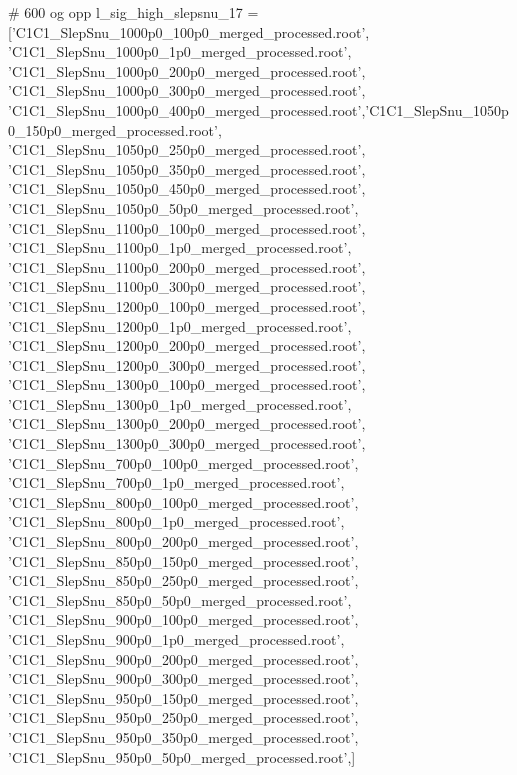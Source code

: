 # 600 og opp
l_sig_high_slepsnu_17 = ['C1C1_SlepSnu_1000p0_100p0_merged_processed.root',
'C1C1_SlepSnu_1000p0_1p0_merged_processed.root',
'C1C1_SlepSnu_1000p0_200p0_merged_processed.root',
'C1C1_SlepSnu_1000p0_300p0_merged_processed.root',
'C1C1_SlepSnu_1000p0_400p0_merged_processed.root','C1C1_SlepSnu_1050p0_150p0_merged_processed.root',
'C1C1_SlepSnu_1050p0_250p0_merged_processed.root',
'C1C1_SlepSnu_1050p0_350p0_merged_processed.root',
'C1C1_SlepSnu_1050p0_450p0_merged_processed.root',
'C1C1_SlepSnu_1050p0_50p0_merged_processed.root',
'C1C1_SlepSnu_1100p0_100p0_merged_processed.root',
'C1C1_SlepSnu_1100p0_1p0_merged_processed.root',
'C1C1_SlepSnu_1100p0_200p0_merged_processed.root',
'C1C1_SlepSnu_1100p0_300p0_merged_processed.root',
'C1C1_SlepSnu_1200p0_100p0_merged_processed.root',
'C1C1_SlepSnu_1200p0_1p0_merged_processed.root',
'C1C1_SlepSnu_1200p0_200p0_merged_processed.root',
'C1C1_SlepSnu_1200p0_300p0_merged_processed.root',
'C1C1_SlepSnu_1300p0_100p0_merged_processed.root',
'C1C1_SlepSnu_1300p0_1p0_merged_processed.root',
'C1C1_SlepSnu_1300p0_200p0_merged_processed.root',
'C1C1_SlepSnu_1300p0_300p0_merged_processed.root',
'C1C1_SlepSnu_700p0_100p0_merged_processed.root',
'C1C1_SlepSnu_700p0_1p0_merged_processed.root',
'C1C1_SlepSnu_800p0_100p0_merged_processed.root',
'C1C1_SlepSnu_800p0_1p0_merged_processed.root',
'C1C1_SlepSnu_800p0_200p0_merged_processed.root',
'C1C1_SlepSnu_850p0_150p0_merged_processed.root',
'C1C1_SlepSnu_850p0_250p0_merged_processed.root',
'C1C1_SlepSnu_850p0_50p0_merged_processed.root',
'C1C1_SlepSnu_900p0_100p0_merged_processed.root',
'C1C1_SlepSnu_900p0_1p0_merged_processed.root',
'C1C1_SlepSnu_900p0_200p0_merged_processed.root',
'C1C1_SlepSnu_900p0_300p0_merged_processed.root',
'C1C1_SlepSnu_950p0_150p0_merged_processed.root',
'C1C1_SlepSnu_950p0_250p0_merged_processed.root',
'C1C1_SlepSnu_950p0_350p0_merged_processed.root',
'C1C1_SlepSnu_950p0_50p0_merged_processed.root',]



